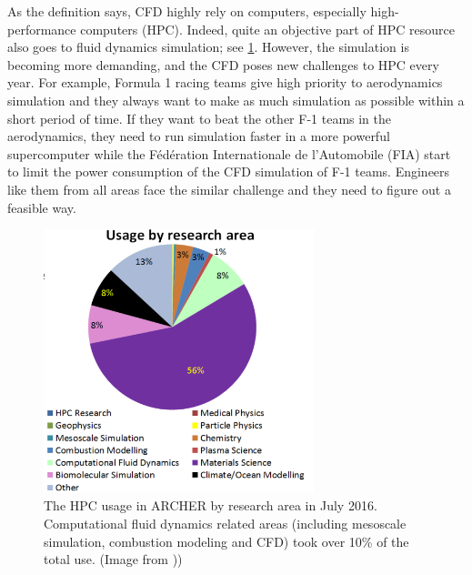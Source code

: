 As the definition says, CFD highly rely on computers, especially high-performance computers (HPC). Indeed, quite an objective part of HPC resource also goes to fluid dynamics simulation; see \ref{fig:break_down}. However, the simulation is becoming more demanding, and the CFD poses new challenges to HPC every year. For example, Formula 1 racing teams give high priority to aerodynamics simulation and they always want to make as much simulation as possible within a short period of time. If they want to beat the other F-1 teams in the aerodynamics, they need to run simulation faster in a more powerful supercomputer while the Fédération Internationale de l'Automobile (FIA) start to limit the power consumption of the CFD simulation \cite{formula1} of F-1 teams. Engineers like them from all areas face the similar challenge and they need to figure out a feasible way.

\begin{figure}[!tb]
    \centering
    \includegraphics[width=0.7\textwidth]{figures/break_down.png}
    \caption{The HPC usage in ARCHER by research area in July 2016. Computational fluid dynamics related areas (including mesoscale simulation, combustion modeling and CFD) took over 10\% of the total use. (Image from \cite{archer_use}))}
    \label{fig:break_down}
\end{figure}




